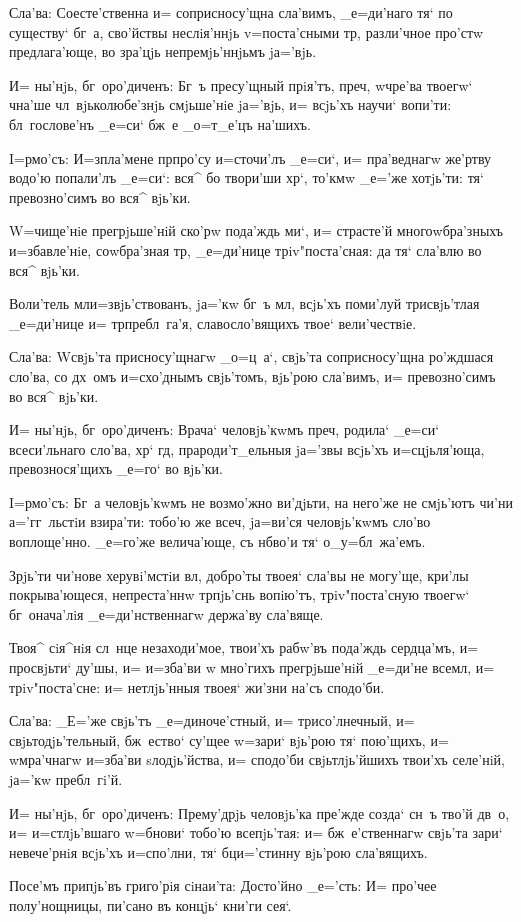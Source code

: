 Сла'ва: Соесте'ственна и= соприсносу'щна сла'вимъ, 
_е=ди'наго тя` по существу` бг~а, сво'йствы неслiя'ннjь 
v=поста'сными тр, разли'чное про'стw предлага'юще, во 
зра'цjь непремjь'ннjьмъ jа='вjь.

И= ны'нjь, бг~оро'диченъ: Бг~ъ пресу'щный прiя'тъ, 
преч, w\т чре'ва твоегw` ч на'ше 
чл~вjьколюбе'знjь смjьше'нiе jа='вjь, и= всjь'хъ научи` 
вопи'ти: бл~гослове'нъ _е=си` бж~е _о=т_е'цъ на'шихъ.


I=рмо'съ: И=з\ъ пла'мене прп ро'су и=сточи'лъ 
_е=си`, и= пра'веднагw же'ртву водо'ю попали'лъ _е=си`: 
вся^ бо твори'ши хр`, то'кмw _е='же хотjь'ти: тя` 
превозно'симъ во вся^ вjь'ки.

W=чище'нiе прегрjьше'нiй ско'рw пода'ждь ми`, и= 
страсте'й многоwбра'зныхъ и=збавле'нiе, соwбра'зная 
тр, _е=ди'нице трiv"поста'сная: да тя` сла'влю во 
вся^ вjь'ки.

Воли'тель мл и=звjь'ствованъ, jа='кw бг~ъ 
мл, всjь'хъ поми'луй трисвjь'тлая _е=ди'нице и= 
тр пребл~га'я, славосло'вящихъ твое` вели'чествiе.

Сла'ва: W\т свjь'та присносу'щнагw _о=ц~а`, свjь'та 
соприсносу'щна ро'ждшася сло'ва, со дх~омъ и=схо'днымъ 
свjь'томъ, вjь'рою сла'вимъ, и= превозно'симъ во вся^ 
вjь'ки.

И= ны'нjь, бг~оро'диченъ: Врача` человjь'кwмъ 
преч, родила` _е=си` всеси'льнаго сло'ва, хр` 
гд, прароди'т_ельныя jа='звы всjь'хъ и=сцjьля'юща, 
превознося'щихъ _е=го` во вjь'ки.


I=рмо'съ: Бг~а человjь'кwмъ не возмо'жно ви'дjьти, на 
него'же не смjь'ютъ чи'ни а='гг~льстiи взира'ти: тобо'ю 
же всеч, jа=ви'ся человjь'кwмъ сло'во воплоще'нно. 
_е=го'же велича'юще, съ нб во'и тя` о_у=бл~жа'емъ.

Зрjь'ти чи'нове херувi'мстiи вл, добро'ты твоея` 
сла'вы не могу'ще, кри'лы покрыва'ющеся, непреста'ннw 
тр пjь'снь вопiю'тъ, трiv"поста'сную твоегw` 
бг~онача'лiя _е=ди'нственнагw держа'ву сла'вяще.

Твоя^ сiя^нiя сл~нце незаходи'мое, твои'хъ рабw'въ 
пода'ждь сердца'мъ, и= просвjьти` ду'шы, и= и=зба'ви w\т 
мно'гихъ прегрjьше'нiй _е=ди'не всемл, и= 
трiv"поста'сне: и= нетлjь'нныя твоея` жи'зни на'съ 
сподо'би. 

Сла'ва: _Е='же свjь'тъ _е=диноче'стный, и= 
трисо'лнечный, и= свjьтодjь'тельный, бж~ество` су'щее 
w=зари` вjь'рою тя` пою'щихъ, и= w\т мра'чнагw и=зба'ви 
sлодjь'йства, и= сподо'би свjьтлjь'йшихъ твои'хъ 
селе'нiй, jа='кw пребл~гi'й.

И= ны'нjь, бг~оро'диченъ: Прему'дрjь человjь'ка 
пре'жде созда` сн~ъ тво'й дв~о, и= и=стлjь'вшаго w=бнови` 
тобо'ю всепjь'тая: и= бж~е'ственнагw свjь'та зари` 
невече'рнiя всjь'хъ и=спо'лни, тя` бц и='стинну 
вjь'рою сла'вящихъ.

Посе'мъ припjь'въ григо'рiя сiнаи'та: Досто'йно 
_е='сть: И= про'чее полу'нощницы, пи'сано въ концjь` 
кни'ги сея`.
